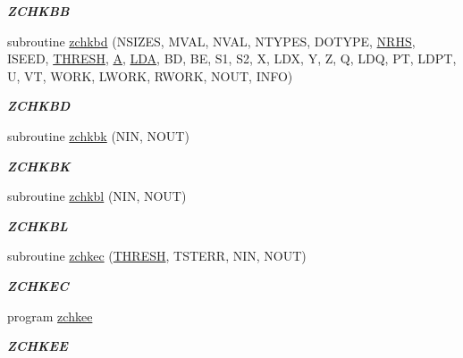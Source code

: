 \begin{DoxyCompactItemize}
\begin{DoxyCompactList}\small\item\em {\bfseries Z\+C\+H\+K\+B\+B} \end{DoxyCompactList}\item 
subroutine \hyperlink{group__complex16__eig_gae8a8aba29ee582b9b36f60338693a761}{zchkbd} (N\+S\+I\+Z\+E\+S, M\+V\+A\+L, N\+V\+A\+L, N\+T\+Y\+P\+E\+S, D\+O\+T\+Y\+P\+E, \hyperlink{example__user_8c_aa0138da002ce2a90360df2f521eb3198}{N\+R\+H\+S}, I\+S\+E\+E\+D, \hyperlink{zlaqgs_8c_a0656018abfc9fa2821827415f5d5ea57}{T\+H\+R\+E\+S\+H}, \hyperlink{classA}{A}, \hyperlink{example__user_8c_ae946da542ce0db94dced19b2ecefd1aa}{L\+D\+A}, B\+D, B\+E, S1, S2, X, L\+D\+X, Y, Z, Q, L\+D\+Q, P\+T, L\+D\+P\+T, U, V\+T, W\+O\+R\+K, L\+W\+O\+R\+K, R\+W\+O\+R\+K, N\+O\+U\+T, I\+N\+F\+O)
\begin{DoxyCompactList}\small\item\em {\bfseries Z\+C\+H\+K\+B\+D} \end{DoxyCompactList}\item 
subroutine \hyperlink{group__complex16__eig_ga2497b5e3c907b7b142fdc6a9f1fb6e84}{zchkbk} (N\+I\+N, N\+O\+U\+T)
\begin{DoxyCompactList}\small\item\em {\bfseries Z\+C\+H\+K\+B\+K} \end{DoxyCompactList}\item 
subroutine \hyperlink{group__complex16__eig_ga7573daf15e153234596fdfebe48c9ca9}{zchkbl} (N\+I\+N, N\+O\+U\+T)
\begin{DoxyCompactList}\small\item\em {\bfseries Z\+C\+H\+K\+B\+L} \end{DoxyCompactList}\item 
subroutine \hyperlink{group__complex16__eig_gab88590f7d1eca9dc769c0be30a6d16c3}{zchkec} (\hyperlink{zlaqgs_8c_a0656018abfc9fa2821827415f5d5ea57}{T\+H\+R\+E\+S\+H}, T\+S\+T\+E\+R\+R, N\+I\+N, N\+O\+U\+T)
\begin{DoxyCompactList}\small\item\em {\bfseries Z\+C\+H\+K\+E\+C} \end{DoxyCompactList}\item 
program \hyperlink{group__complex16__eig_gae499dac46ffdbb5251d1221610866e68}{zchkee}
\begin{DoxyCompactList}\small\item\em {\bfseries Z\+C\+H\+K\+E\+E} \end{DoxyCompactList}\item 

\end{DoxyCompactItemize}
